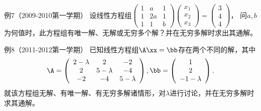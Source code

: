 \begin{frame}\ft{\subsecname}
  \begin{scriptsize}
    \begin{exampleblock}{例7（2009-2010第一学期）}
      设线性方程组$\left(
      \begin{array}{ccc}
        1&a&1\\
        1&2a&1\\
        1&1&b
      \end{array}
      \right)\left(
      \begin{array}{c}
        x_1\\x_2\\x_3
      \end{array}
      \right)=\left(
      \begin{array}{c}
        3\\4 \\4
      \end{array}
      \right)$，
      问$a,b$为何值时，此方程组有唯一解、无解或无穷多个解？并在无穷多解时求出其通解。
    \end{exampleblock}

    \begin{exampleblock}{例8（2011-2012第一学期）}
    已知线性方程组$\A\xx=\bb$存在两个不同的解，其中$$\A=\left(
    \begin{array}{ccc}
        2-\lambda&2&-2\\
        2&5-\lambda&-4\\
        -2&-4&5-\lambda
      \end{array}
    \right),\bb=\left(
      \begin{array}{c}
        1\\2\\-1-\lambda
      \end{array}
      \right).$$
      就该方程组无解、有唯一解、有无穷多解诸情形，对$\lambda$进行讨论，并在无穷多解时求其通解。
    \end{exampleblock}

  \end{scriptsize}
\end{frame}

